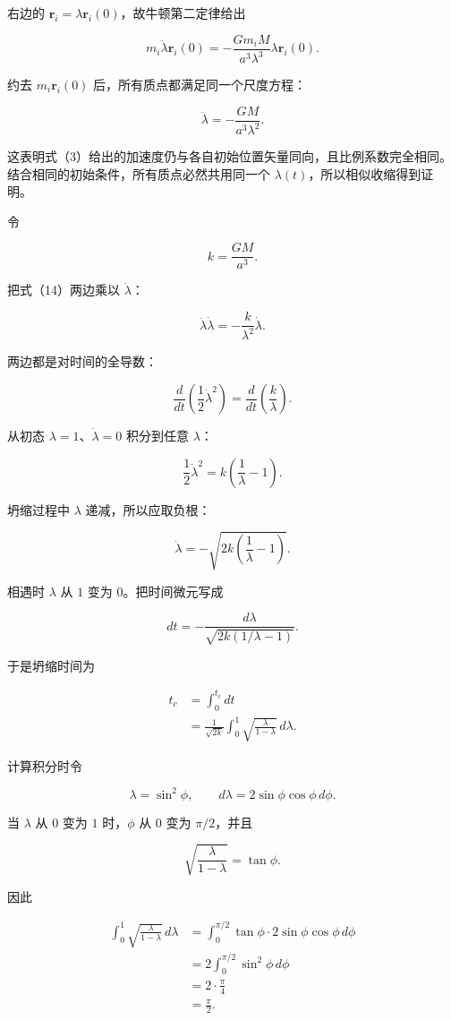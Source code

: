 \documentclass[12pt,a4paper,UTF8]{ctexart}
\begin{document}
右边的 \(\boldsymbol r_i=\lambda\boldsymbol r_i(0)\)，故牛顿第二定律给出

\[
m_i\ddot\lambda\boldsymbol r_i(0)
=-\frac{Gm_iM}{a^3\lambda^3}
\lambda\boldsymbol r_i(0). \tag{13}
\]

约去 \(m_i\boldsymbol r_i(0)\) 后，所有质点都满足同一个尺度方程：

\[
\boxed{
\ddot\lambda=-\frac{GM}{a^3\lambda^2}
}. \tag{14}
\]

这表明式（3）给出的加速度仍与各自初始位置矢量同向，且比例系数完全相同。结合相同的初始条件，所有质点必然共用同一个
\(\lambda(t)\)，所以相似收缩得到证明。

令

\[
k=\frac{GM}{a^3}. \tag{15}
\]

把式（14）两边乘以 \(\dot\lambda\)：

\[
\ddot\lambda\dot\lambda
=-\frac{k}{\lambda^2}\dot\lambda. \tag{16}
\]

两边都是对时间的全导数：

\[
\frac{d}{dt}\left(\frac12\dot\lambda^2\right)
=\frac{d}{dt}\left(\frac{k}{\lambda}\right). \tag{17}
\]

从初态 \(\lambda=1\)、\(\dot\lambda=0\) 积分到任意 \(\lambda\)：

\[
\frac12\dot\lambda^2
=k\left(\frac1\lambda-1\right). \tag{18}
\]

坍缩过程中 \(\lambda\) 递减，所以应取负根：

\[
\dot\lambda
=-\sqrt{2k\left(\frac1\lambda-1\right)}. \tag{19}
\]

相遇时 \(\lambda\) 从 \(1\) 变为 \(0\)。把时间微元写成

\[
dt
=-\frac{d\lambda}
{\sqrt{2k(1/\lambda-1)}}. \tag{20}
\]

于是坍缩时间为

\[
\begin{aligned}
t_c
&=\int_0^{t_c}dt\\
&=\frac1{\sqrt{2k}}
  \int_0^1\sqrt{\frac{\lambda}{1-\lambda}}\,d\lambda.
\end{aligned} \tag{21}
\]

计算积分时令

\[
\lambda=\sin^2\phi,
\qquad
d\lambda=2\sin\phi\cos\phi\,d\phi. \tag{22}
\]

当 \(\lambda\) 从 \(0\) 变为 \(1\) 时，\(\phi\) 从 \(0\) 变为
\(\pi/2\)，并且

\[
\sqrt{\frac{\lambda}{1-\lambda}}=\tan\phi. \tag{23}
\]

因此

\[
\begin{aligned}
\int_0^1\sqrt{\frac{\lambda}{1-\lambda}}\,d\lambda
&=\int_0^{\pi/2}
  \tan\phi\cdot2\sin\phi\cos\phi\,d\phi\\
&=2\int_0^{\pi/2}\sin^2\phi\,d\phi\\
&=2\cdot\frac\pi4\\
&=\frac\pi2.
\end{aligned} \tag{24}
\]
\end{document}
